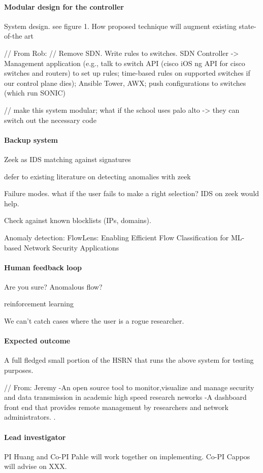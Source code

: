 \paragraph{Modular design for the controller}

System design. see figure 1. How proposed technique will augment existing state-of-the art

// From Rob: // Remove SDN. Write rules to switches. SDN Controller -> Management application (e.g., talk to switch API (cisco iOS ng API for cisco switches and routers)  to set up rules; time-based rules on supported switches if our control plane dies); Ansible Tower, AWX; push configurations to switches (which run SONIC)

// make this system modular; what if the school uses palo alto -> they can switch out the necessary code




\paragraph{Backup system} Zeek as IDS
matching against signatures

defer to existing literature on detecting anomalies with zeek

Failure modes. what if the user fails to make a right selection? IDS on zeek would help.

Check against known blocklists (IPs, domains).


Anomaly detection:
FlowLens: Enabling Efficient Flow Classification for ML-based Network Security Applications




\paragraph{Human feedback loop}

Are you sure? Anomalous flow?

reinforcement learning



We can't catch cases where the user is a rogue researcher.


\paragraph{Expected outcome} A full fledged small portion of the HSRN that runs the above system for testing purposes.

// From: Jeremy
-An open source tool to monitor,visualize and manage security and data transmission in academic high speed research neworks
-A dashboard front end that  provides remote management by researchers and network administrators. .


\paragraph{Lead investigator} PI Huang and Co-PI Pahle will work together on implementing. Co-PI Cappos will advise on XXX.
